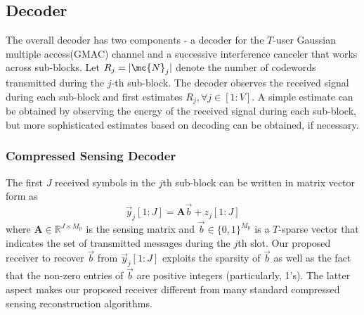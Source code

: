 \documentclass[final,onecolumn,12pt]{IEEEtran}
\newif\iflonger
\begin{document}
\subsection{Decoder}
The overall decoder has two components - a decoder for the $T$-user Gaussian multiple access(GMAC) channel and a successive interference canceler that works across sub-blocks. Let $R_j=|\mc{N}_j|$ denote the number of codewords transmitted during the $j$-th sub-block. The decoder observes the received signal during each sub-block and first estimates $R_j, \forall j \in [1:V]$. A simple estimate can be obtained by observing the energy of the received signal during each sub-block, but more sophisticated estimates based on decoding can be obtained, if necessary. 
\iflonger
If $R_j < T$, then the compressed sensing decoder $h(\yv_j[1:J],\mathbf{A},R_j)$, given
\[
\vec{y}_{j}[1:J]=\sum_{i\in\mc{N}_j} \vec{a}_{w_{i,2}}+z_{j}[1:J], %
\label{eq:cross_correlation}
\]
estimates the set of the preamble message indices denoted by $\mc{T}_2\coleq\{\hat{w}_{i,2}:i\in\mc{N}_j\}$ for the $R_j$ users transmitted in $j$th sub-block. We explain the workings of the compressed sensing decoder $h(\vec{y},\mathbf{A},T)$ in Sec. \ref{sec:CS_decoder}. Once the preamble message indices $\hat{w}_{i,2}$'s are estimated which gives the set of permutations $\pi_{\tau_{\hat{w}_{i,2}}}$ employed on the SCLDPC codewords at the respective users, the set of $R_j$ coding message indices $\mc{T}_1\coleq\{\hat{w}_{i,1}:i\in\mc{N}_j\}$ are decoded using a message passing decoder on the joint Tanner graph described in Sec. \ref{sec:BP_GMAC}. Once the messages transmitted during the $j$th sub-block are decoded, then other sub-blocks where the codewords were repeated can be obtained using the function $g(w_i=(w_{i,1},w_{i,2}))$. Then the codeword is subtracted or `peeled off' from the received signal during those slots, $R_j$ is updated for those slots and the process is repeated until either all the users are decoded or, no sub-blocks with less than $T$ codewords remain.\\
\fi

\subsubsection{Compressed Sensing Decoder}
\label{sec:CS_decoder}
The first $J$ received symbols in the $j$th sub-block can be written in matrix vector form as
\begin{equation}
\label{eq:cross_correlation}
\vec{y}_{j}[1:J] = \mathbf{A}\vec{b}+z_{j}[1:J]
\end{equation}
where $\mathbf{A} \in \mathbb{R}^{J \times M_\mathrm{p}}$ is the sensing matrix and $\vec{b} \in \{0,1\}^{M_\mathrm{p}}$ is a $T$-sparse vector that indicates the set of transmitted messages during the $j$th slot. Our proposed receiver to recover $\vec{b}$ from $\vec{y}_{j}[1:J]$ exploits the sparsity of $\vec{b}$ as well as the fact that the non-zero entries of $\vec{b}$ are positive integers (particularly, 1's). The latter aspect makes our proposed receiver different from many standard compressed sensing reconstruction algorithms.
\end{document}
